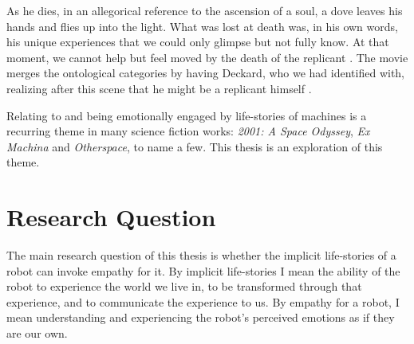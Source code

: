 As he dies, in an allegorical reference to the ascension of a soul, a dove leaves his hands and flies up into the light. What was lost at death was, in his own words, his unique experiences that we could only glimpse but not fully know. At that moment, we cannot help but feel moved by the death of the replicant \cite{rowlands_philosopher_end_universe}. The movie merges the ontological categories by having Deckard, who we had identified with, realizing after this scene that he might be a replicant himself \cite{mulhall_blade_runner}. 


Relating to and being emotionally engaged by life-stories of machines is a recurring theme in many science fiction works: \textit{2001: A Space Odyssey}, \textit{Ex Machina} and \textit{Otherspace}, to name a few. This thesis is an exploration of this theme.



\section{Research Question}

The main research question of this thesis is whether the implicit life-stories of a robot can invoke empathy for it. By implicit life-stories I mean the ability of the robot to experience the world we live in, to be transformed through that experience, and  to communicate the experience to us. By empathy for a robot, I mean understanding and experiencing the robot's perceived emotions as if they are our own. 

%


